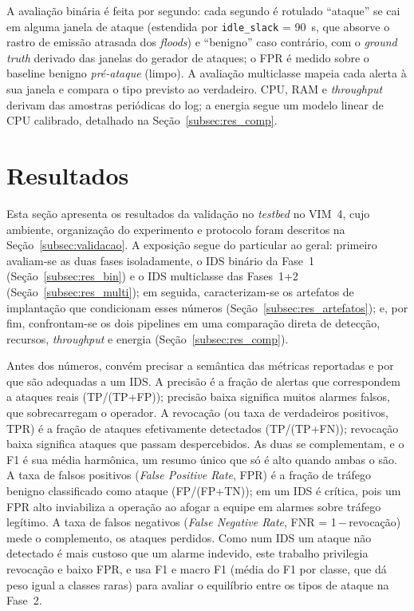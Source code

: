\documentclass[12pt]{article}
\begin{document}
A avaliação binária é feita por
segundo: cada segundo é rotulado ``ataque'' se cai em alguma janela de ataque
(estendida por \texttt{idle\_slack} = 90~s, que absorve o rastro de emissão
atrasada dos \textit{floods}) e ``benigno'' caso contrário, com o \textit{ground
truth} derivado das janelas do gerador de ataques; o FPR é medido sobre o baseline
benigno \textit{pré-ataque} (limpo). A avaliação multiclasse mapeia cada alerta à
sua janela e compara o tipo previsto ao verdadeiro. CPU, RAM e \textit{throughput}
derivam das amostras periódicas do log; a energia segue um modelo linear de CPU
calibrado, detalhado na Seção~\ref{subsec:res_comp}.

\section{Resultados}
\label{sec:resultados}

Esta seção apresenta os resultados da validação no \textit{testbed} no VIM~4, cujo ambiente,
organização do experimento e protocolo foram descritos na
Seção~\ref{subsec:validacao}. A exposição segue do particular ao geral: primeiro
avaliam-se as duas fases isoladamente, o IDS binário da Fase~1
(Seção~\ref{subsec:res_bin}) e o IDS multiclasse das Fases~1+2
(Seção~\ref{subsec:res_multi}); em seguida, caracterizam-se os artefatos de
implantação que condicionam esses números (Seção~\ref{subsec:res_artefatos}); e,
por fim, confrontam-se os dois pipelines em uma comparação direta de detecção,
recursos, \textit{throughput} e energia (Seção~\ref{subsec:res_comp}).

Antes dos números, convém precisar a semântica das métricas reportadas e por que
são adequadas a um IDS. A precisão é a fração de alertas que correspondem
a ataques reais (TP/(TP+FP)); precisão baixa significa muitos alarmes falsos, que
sobrecarregam o operador. A revocação (ou taxa de verdadeiros positivos,
TPR) é a fração de ataques efetivamente detectados (TP/(TP+FN)); revocação baixa
significa ataques que passam despercebidos. As duas se complementam, e o
F1 é sua média harmônica, um resumo único que só é alto quando ambas o
são. A taxa de falsos positivos (\textit{False Positive Rate}, FPR) é a
fração de tráfego benigno classificado como ataque (FP/(FP+TN)); em um IDS é
crítica, pois um FPR alto inviabiliza a operação ao afogar a equipe em alarmes
sobre tráfego legítimo. A taxa de falsos negativos (\textit{False
Negative Rate}, FNR = 1\,$-$\,revocação) mede o complemento, os ataques perdidos.
Como num IDS um ataque não detectado é mais custoso que um alarme indevido, este
trabalho privilegia revocação e baixo FPR, e usa F1 e macro F1 (média do
F1 por classe, que dá peso igual a classes raras) para avaliar o equilíbrio entre
os tipos de ataque na Fase~2.
\end{document}
